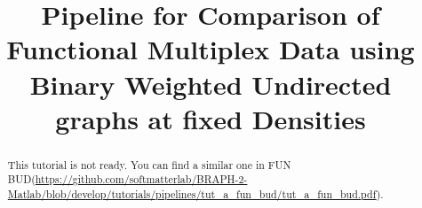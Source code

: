 \documentclass[justified]{tufte-handout}
\title{Pipeline for Comparison of Functional Multiplex Data using Binary Weighted Undirected graphs at fixed Densities}
\begin{document}
\maketitle

\begin{abstract}
\noindent
This tutorial is not ready. You can find a similar one in FUN BUD(\url{https://github.com/softmatterlab/BRAPH-2-Matlab/blob/develop/tutorials/pipelines/tut_a_fun_bud/tut_a_fun_bud.pdf}).
\end{abstract}
\end{document}
